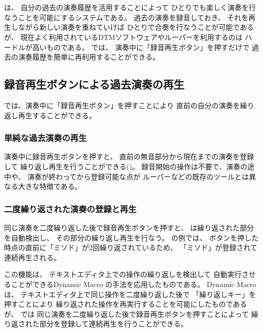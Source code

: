 %
%
\section{\system}
\label{repiano}

{\system}は、
自分の過去の演奏履歴を活用することによって
ひとりでも楽しく演奏を行なうことを可能にするシステムである。
%
過去の演奏を録音しておき、
それを再生しながら新しい演奏を重ねていけば
ひとりで合奏を行なうことが可能であるが、
現在よく利用されているDTMソフトウェアやルーパーを利用するのは
ハードルが高いものである。
{\system}では、
演奏中に「録音再生ボタン」を押すだけで
過去の演奏履歴を簡単に再利用することができる。

\subsection{録音再生ボタンによる過去演奏の再生}
\label{recplaybutton}

{\system}では、演奏中に「録音再生ボタン」を押すことにより
直前の自分の演奏を繰り返し再生することができる。

\subsubsection{単純な過去演奏の再生}

演奏中に録音再生ボタンを押すと、
直前の無音部分から現在までの演奏を登録して
繰り返し再生を行うことができる()。
%
録音開始の操作は不要で、演奏の途中や、
演奏が終わってから登録可能な点が
ルーパーなどの既存のツールとは異なる大きな特徴である。

\subsubsection{二度繰り返された演奏の登録と再生}

同じ演奏を二度繰り返した後で録音再生ボタンを押すと、
{\system}は繰り返された部分を自動検出し、
その部分の繰り返し再生を行なう。
の例では、
ボタンを押した時点の直前に「ミソド」が2回繰り返されているため、
「ミソド」が登録されて連続再生される。

この機能は、
テキストエディタ上での操作の繰り返しを検出して
自動実行させることができるDynamic Macro\cite{masui}
の手法を応用したものである。
Dynamic Macroは、
テキストエディタ上で同じ操作を二度繰り返した後で
「繰り返しキー」を押すことにより
繰り返された操作を再実行することを可能にしたものであるが、
{\system}では
同じ演奏を二度繰り返した後で録音再生ボタンを押すことによって
繰り返された部分を登録して連続再生を行うことができる。

